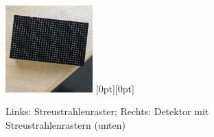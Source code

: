 \documentclass[a4paper,12pt]{article}
\theoremstyle{definition}
\theoremstyle{remark}
\begin{document}
\begin{figure}[ht]
    \centering
    \includegraphics[width=0.30\textwidth]{Bilder/Raster.jpg}%
    \hspace{0.03\textwidth}%
    \raisebox{0pt}[0pt][0pt]{}
    \caption{Links: Streustrahlenraster; Rechts: Detektor mit Streustrahlenrastern (unten)}
\end{figure}
\end{document}
